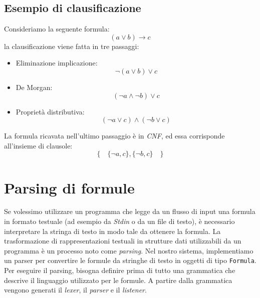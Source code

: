 \documentclass[a4paper,12pt]{report}
\begin{document}
\subsection{Esempio di clausificazione}
Consideriamo la seguente formula:
\[ (a \lor b) \to c \]
la clausificazione viene fatta in tre passaggi:

\begin{itemize}
    \item Eliminazione implicazione:
    \[ \lnot (a \lor b) \lor c \]
    \item De Morgan:
    \[ (\lnot a \land \lnot b) \lor c \]
    \item Proprietà distributiva:
    \[ (\lnot a \lor c) \land (\lnot b \lor c) \]
\end{itemize}
La formula ricavata nell'ultimo passaggio è in \emph{CNF}, ed essa corrisponde all'insieme di clausole:
\[ \{ \quad \{\lnot a, c\}, \{\lnot b, c\} \quad \} \]

\section{Parsing di formule}
\label{parsing}
Se volessimo utilizzare un programma che legge da un flusso di input una formula in formato testuale (ad esempio da \emph{Stdin} o da un file di testo), è necessario interpretare la stringa di testo in modo tale da ottenere la formula. La trasformazione di rappresentazioni testuali in strutture dati utilizzabili da un programma è un processo noto come \emph{parsing}. Nel nostro sistema, implementiamo un parser per convertire le formule da stringhe di testo in oggetti di tipo \texttt{Formula}. Per eseguire il parsing, bisogna definire prima di tutto una grammatica che descrive il linguaggio utilizzato per le formule. A partire dalla grammatica vengono generati il \emph{lexer}, il \emph{parser} e il \emph{listener}.
\end{document}
